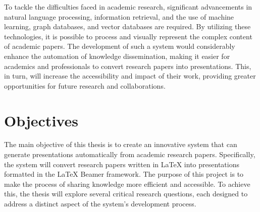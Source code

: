 To tackle the difficulties faced in academic research, significant advancements in natural language processing, information retrieval, and the use of machine learning, graph databases, and vector databases are required. By utilizing these technologies, it is possible to process and visually represent the complex content of academic papers. The development of such a system would considerably enhance the automation of knowledge dissemination, making it easier for academics and professionals to convert research papers into presentations. This, in turn, will increase the accessibility and impact of their work, providing greater opportunities for future research and collaborations.

\section{Objectives}
\label{sec:intro:objectives}


The main objective of this thesis is to create an innovative system that can generate presentations automatically from academic research papers. Specifically, the system will convert research papers written in \LaTeX{} into presentations formatted in the \LaTeX{} Beamer framework. The purpose of this project is to make the process of sharing knowledge more efficient and accessible. To achieve this, the thesis will explore several critical research questions, each designed to address a distinct aspect of the system's development process.

